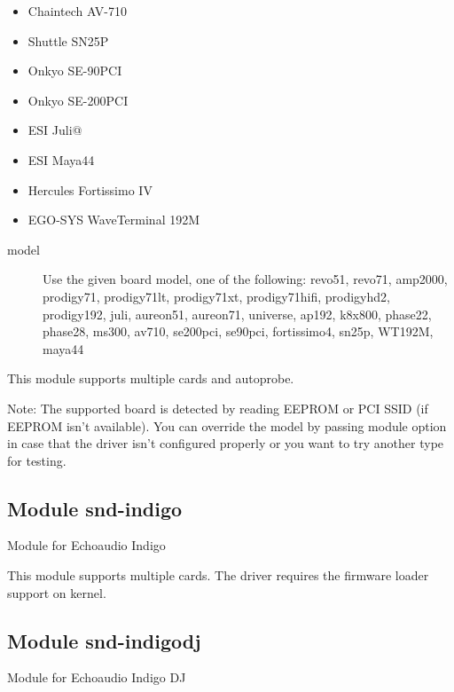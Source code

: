 \documentclass[a4paper,8pt,english]{sphinxmanual}
\begin{document}
\begin{itemize}
\item {} 
Chaintech AV-710

\item {} 
Shuttle SN25P

\item {} 
Onkyo SE-90PCI

\item {} 
Onkyo SE-200PCI

\item {} 
ESI Juli@

\item {} 
ESI Maya44

\item {} 
Hercules Fortissimo IV

\item {} 
EGO-SYS WaveTerminal 192M

\end{itemize}
\begin{description}
\item[{model}] \leavevmode
Use the given board model, one of the following:
revo51, revo71, amp2000, prodigy71, prodigy71lt,
prodigy71xt, prodigy71hifi, prodigyhd2, prodigy192,
juli, aureon51, aureon71, universe, ap192, k8x800,
phase22, phase28, ms300, av710, se200pci, se90pci,
fortissimo4, sn25p, WT192M, maya44

\end{description}

This module supports multiple cards and autoprobe.

Note: The supported board is detected by reading EEPROM or PCI
SSID (if EEPROM isn't available).  You can override the
model by passing  module option in case that the
driver isn't configured properly or you want to try another
type for testing.


\subsection{Module snd-indigo}
\label{sound/alsa-configuration:module-snd-indigo}
Module for Echoaudio Indigo

This module supports multiple cards.
The driver requires the firmware loader support on kernel.


\subsection{Module snd-indigodj}
\label{sound/alsa-configuration:module-snd-indigodj}
Module for Echoaudio Indigo DJ
\end{document}
